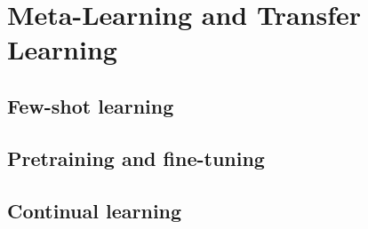 ﻿\chapter{Meta-Learning and Transfer Learning}
\section{Few-shot learning}

\section{Pretraining and fine-tuning}

\section{Continual learning}


